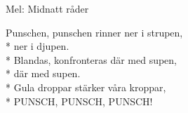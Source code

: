 \begin{SongText}
    \begin{SongInfo}
        Mel: Midnatt råder
    \end{SongInfo}
    \begin{SongVerse}
        Punschen, punschen rinner ner i strupen,\\*%
        ner i djupen.\\*%
        Blandas, konfronteras där med supen,\\*%
        där med supen.\\*%
        Gula droppar stärker våra kroppar,\\*%
        PUNSCH, PUNSCH, PUNSCH!
    \end{SongVerse}\end{SongText}
